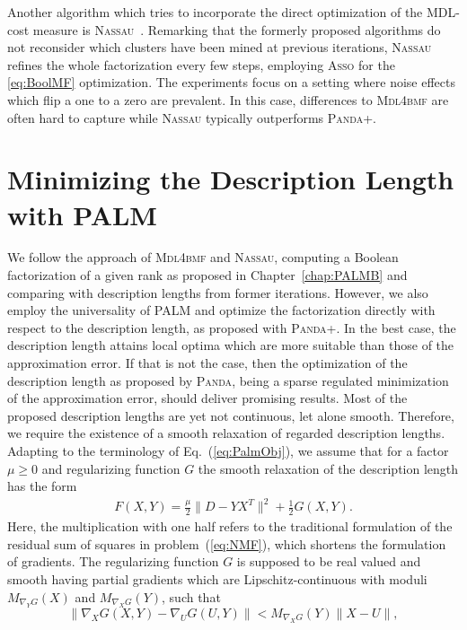 Another algorithm which tries to incorporate the direct optimization of the MDL-cost measure is \textsc{Nassau}~\citep{karaev2015getting}. Remarking that the formerly proposed algorithms do not reconsider which clusters have been mined at previous iterations, \textsc{Nassau} refines the whole factorization every few steps, employing \textsc{Asso} for the \ref{eq:BoolMF} optimization. The experiments focus on a setting where noise effects which flip a one to a zero are prevalent. In this case, differences to \textsc{Mdl4bmf} are often hard to capture while \textsc{Nassau} typically outperforms \textsc{Panda+}. 

\section{Minimizing the Description Length with PALM}
We follow the approach of \textsc{Mdl4bmf} and \textsc{Nassau}, computing a Boolean factorization of a given rank as proposed in Chapter~\ref{chap:PALMB} and comparing with description lengths from former iterations. However, we also employ the universality of PALM and optimize the factorization directly with respect to the description length, as proposed with \textsc{Panda+}. In the best case, the description length attains local optima which are more suitable than those of the approximation error. If that is not the case, then the optimization of the description length as proposed by \textsc{Panda}, being a sparse regulated minimization of the approximation error, should deliver promising results. Most of the proposed description lengths are yet not continuous, let alone smooth.  Therefore, we require the existence of a smooth relaxation of regarded description lengths. Adapting to the terminology of Eq.~(\ref{eq:PalmObj}), we assume that for a factor $\mu\geq 0$ and regularizing function $G$ the smooth relaxation of the description length has the form 
\begin{align}\label{eq:F_PALTiling}
	F(X,Y)= \frac{\mu}{2}\|D-YX^T\|^2 + \frac{1}{2} G(X,Y).
\end{align} 
Here, the multiplication with one half refers to the traditional formulation of the residual sum of squares in problem~(\ref{eq:NMF}), which shortens the formulation of gradients. 
The regularizing function $G$ is supposed to be real valued and smooth having partial gradients which are Lipschitz-continuous with moduli $M_{\nabla_YG}(X)$ and $M_{\nabla_XG}(Y)$, such that
\[\|\nabla_XG(X,Y)-\nabla_UG(U,Y)\|< M_{\nabla_XG}(Y)\|X-U\|,\]
